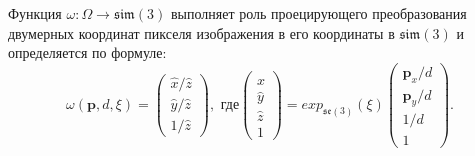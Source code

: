 Функция $\omega: \Omega \rightarrow \mathfrak{sim}(3)$ выполняет роль проецирующего преобразования двумерных координат пикселя изображения в его координаты в $\mathfrak{sim}(3)$ и определяется по формуле:
\begin{equation}
    \label{warpFunction}
    \omega(\mathbf{p}, d, \xi) = \left(
                                \begin{array}{lll}
                                    \hat x / \hat z \\
                                    \hat y / \hat z \\
                                    1 / \hat z
                                \end{array}
                                \right),
    \text{~где}  \left(
                \begin{array}{llll}
                    \hat x \\
                    \hat y \\
                    \hat z \\
                    1
                \end{array}
                \right)
                =
                exp_{\mathfrak{se}(3)}(\xi)   \left(
                                            \begin{array}{llll}
                                                \mathbf{p}_x / d \\
                                                \mathbf{p}_y / d \\
                                                1 / d \\
                                                1
                                            \end{array}
                                            \right).
\end{equation}



